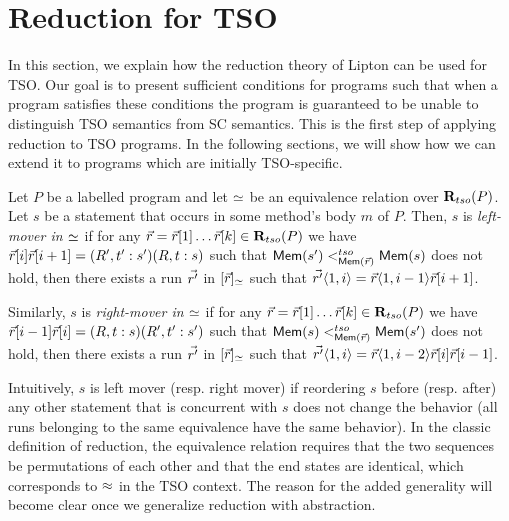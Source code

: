 \section{Reduction for TSO}
\label{sec:reduction-for-tso}
In this section, we explain how the reduction theory of Lipton can be used for TSO.
Our goal is to present sufficient conditions for programs such that when a program satisfies these conditions the program is guaranteed to be unable to distinguish TSO semantics from SC semantics. 
This is the first step of applying reduction to TSO programs.
In the following sections, we will show how we can extend it to programs which are initially TSO-specific.

\begin{definition}[Movers]
\label{def:movers}
Let $P$ be a labelled program and let $\simeq$ be an equivalence relation over $\mathbf{R}_{tso}(P)$.
Let $s$ be a statement that occurs in some method's body $m$ of $P$.
Then, $s$ is {\em left-mover in $\simeq$} if for any $\vec{r}=\vec{r}[1]\ldots\vec{r}[k]\in\mathbf{R}_{tso}(P)$ we have $\vec{r}[i]\vec{r}[i+1]=(R',t':s')(R,t:s)$ such that $\mathsf{Mem}(s') <^{tso}_{\mathsf{Mem}(\vec{r})} \mathsf{Mem}(s)$ does not hold, then there exists a run $\vec{r'}$ in $[\vec{r}]_{\simeq}$ such that $\vec{r'}\langle 1,i\rangle=\vec{r}\langle 1,i-1\rangle \vec{r}[i+1]$.

Similarly, $s$ is {\em right-mover in $\simeq$} if for any $\vec{r}=\vec{r}[1]\ldots\vec{r}[k]\in\mathbf{R}_{tso}(P)$ we have $\vec{r}[i-1]\vec{r}[i]=(R,t:s)(R',t':s')$ such that $\mathsf{Mem}(s) <^{tso}_{\mathsf{Mem}(\vec{r})} \mathsf{Mem}(s')$ does not hold, then there exists a run $\vec{r'}$ in $[\vec{r}]_{\simeq}$ such that $\vec{r'}\langle 1,i\rangle=\vec{r}\langle 1,i-2\rangle \vec{r}[i]\vec{r}[i-1]$.
\end{definition}

Intuitively, $s$ is left mover (resp. right mover) if reordering $s$ before (resp. after) any other statement that is concurrent with $s$ does not change the behavior (all runs belonging to the same equivalence have the same behavior).
In the classic definition of reduction, the equivalence relation requires that the two sequences be permutations of each other and that the end states are identical, which corresponds to $\approx$ in the TSO context.
The reason for the added generality will become clear once we generalize reduction with abstraction.


